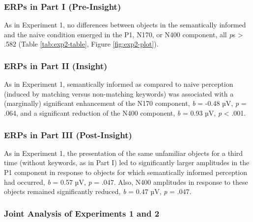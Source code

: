 \documentclass[
  english,
  man,11pt,floatsintext]{apa7}
\begin{document}
\hypertarget{erps-in-part-i-pre-insight-1}{%
\subsubsection{ERPs in Part I (Pre-Insight)}\label{erps-in-part-i-pre-insight-1}}

As in Experiment 1, no differences between objects in the semantically informed and the naive condition emerged in the P1, N170, or N400 component, all \emph{p}s \textgreater{} .582 (Table \ref{tab:exp2-table}, Figure \ref{fig:exp2-plot}).

\hypertarget{erps-in-part-ii-insight-1}{%
\subsubsection{ERPs in Part II (Insight)}\label{erps-in-part-ii-insight-1}}

As in Experiment 1, semantically informed as compared to naive perception (induced by matching versus non-matching keywords) was associated with a (marginally) significant enhancement of the N170 component, \emph{b} = -0.48 µV, \emph{p} = .064, and a significant reduction of the N400 component, \emph{b} = 0.93 µV, \emph{p} \textless{} .001.

\hypertarget{erps-in-part-iii-post-insight-1}{%
\subsubsection{ERPs in Part III (Post-Insight)}\label{erps-in-part-iii-post-insight-1}}

As in Experiment 1, the presentation of the same unfamiliar objects for a third time (without keywords, as in Part I) led to significantly larger amplitudes in the P1 component in response to objects for which semantically informed perception had occurred, \emph{b} = 0.57 µV, \emph{p} = .047. Also, N400 amplitudes in response to these objects remained significantly reduced, \emph{b} = 0.47 µV, \emph{p} = .047.

\hypertarget{joint-analysis-of-experiments-1-and-2}{%
\subsubsection{Joint Analysis of Experiments 1 and 2}\label{joint-analysis-of-experiments-1-and-2}}
\end{document}
